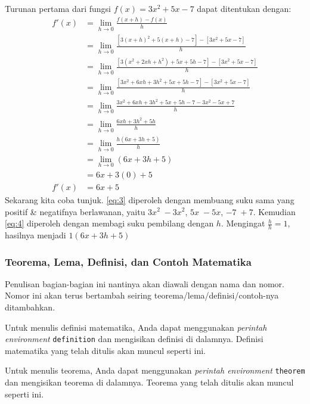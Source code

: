 \begin{enumerate}[label=\arabic*)]
    Turunan pertama dari fungsi $f(x) = 3x^2 + 5x − 7$ dapat ditentukan dengan:
    \begin{align}
        f'(x) &= \lim_{h \to 0} \frac{f(x+h) - f(x)}{h} \nonumber \\
        &= \lim_{h \to 0} \frac{[3(x+h)^2 + 5(x+h) - 7] - [3x^2 + 5x - 7]}{h} \nonumber \\
        &= \lim_{h \to 0} \frac{[3(x^2 + 2xh + h^2) + 5x + 5h - 7] - [3x^2 + 5x - 7]}{h} \nonumber \\
        &= \lim_{h \to 0} \frac{[3x^2 + 6xh + 3h^2 + 5x + 5h - 7] - [3x^2 + 5x - 7]}{h} \nonumber \\
        &= \lim_{h \to 0} \frac{3x^2 + 6xh + 3h^2 + 5x + 5h - 7 - 3x^2 - 5x + 7}{h} \nonumber \\
        &= \lim_{h \to 0} \frac{6xh + 3h^2 + 5h}{h} \label{eq:3} \\
        &= \lim_{h \to 0} \frac{h(6x + 3h + 5)}{h} \nonumber \\
        &= \lim_{h \to 0} (6x + 3h + 5) \label{eq:4} \\
        &= 6x + 3(0) + 5 \nonumber \\
        f'(x) &= 6x + 5 \nonumber
    \end{align}
    Sekarang kita coba tunjuk. \autoref{eq:3} diperoleh dengan membuang suku sama yang positif \& negatifnya berlawanan, yaitu $3x^2\; -3x^2$, $5x\; -5x$, $-7\; +7$. Kemudian \eqref{eq:4} diperoleh dengan membagi suku pembilang dengan $h$. Mengingat $\frac{h}{h} = 1$, hasilnya menjadi $1(6x + 3h + 5)$
\end{enumerate}

\subsubsection{Teorema, Lema, Definisi, dan Contoh Matematika}

Penulisan bagian-bagian ini nantinya akan diawali dengan nama dan nomor. Nomor ini akan terus bertambah seiring teorema/lema/definisi/contoh-nya ditambahkan.

\begin{definition}
    Untuk menulis definisi matematika, Anda dapat menggunakan \textit{perintah environment} \texttt{definition} dan mengisikan definisi di dalamnya. Definisi matematika yang telah ditulis akan muncul seperti ini.
\end{definition}

\begin{theorem}
    Untuk menulis teorema, Anda dapat menggunakan \textit{perintah environment} \texttt{theorem} dan mengisikan teorema di dalamnya. Teorema yang telah ditulis akan muncul seperti ini.
\end{theorem}

